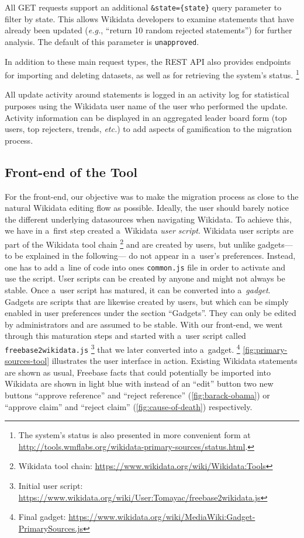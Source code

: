 \documentclass{acm_proc_article-sp}
\begin{document}
All GET requests support an additional \verb|&state={state}| query parameter to filter by state.
This allows Wikidata developers to examine statements
that have already been updated (\emph{e.g.}, ``return 10 random rejected statements'')
for further analysis.
The default of this parameter is \verb|unapproved|.

In addition to these main request types, the REST API also provides endpoints
for importing and deleting datasets, as well as for retrieving the system's status.%
\footnote{The system's status is also presented in more convenient form at
\url{http://tools.wmflabs.org/wikidata-primary-sources/status.html}.}

All update activity around statements is logged in an activity log
for statistical purposes using the Wikidata user name of the user who performed the update.
Activity information can be displayed in an aggregated leader board form
(top users, top rejecters, trends, \emph{etc.}) to add aspects of gamification to the migration process.

\subsection{Front-end of the Tool}

For the front-end, our objective was to make the migration process
as close to the natural Wikidata editing flow as possible.
Ideally, the user should barely notice the different underlying datasources
when navigating Wikidata.
To achieve this, we have in a~first step created a~Wikidata \emph{user script}.
Wikidata user scripts are part of the Wikidata tool chain%
\footnote{Wikidata tool chain:
\url{https://www.wikidata.org/wiki/Wikidata:Tools}}
and are created by users, but unlike gadgets---to be explained in the following---%
do not appear in a~user's preferences.
Instead, one has to add a~line of code into ones \texttt{common.js} file
in order to activate and use the script.
User scripts can be created by anyone and might not always be stable.
Once a~user script has matured, it can be converted into a~\emph{gadget}.
Gadgets are scripts that are likewise created by users,
but which can be simply enabled in user preferences under the section ``Gadgets''.
They can only be edited by administrators and are assumed to be stable.
With our front-end, we went through this maturation steps
and started with a~user script called \texttt{freebase2wikidata.js}%
\footnote{Initial user script:
\url{https://www.wikidata.org/wiki/User:Tomayac/freebase2wikidata.js}}
that we later converted into a~gadget.%
\footnote{Final gadget: \url{https://www.wikidata.org/wiki/MediaWiki:Gadget-PrimarySources.js}}
\autoref{fig:primary-sources-tool} illustrates the user interface in action.
Existing Wikidata statements are shown as usual,
Freebase facts that could potentially be imported into Wikidata are shown in light blue
with instead of an ``edit'' button two new buttons ``approve reference'' and ``reject reference''
(\autoref{fig:barack-obama}) or ``approve claim'' and ``reject claim''
(\autoref{fig:cause-of-death}) respectively.
\end{document}
